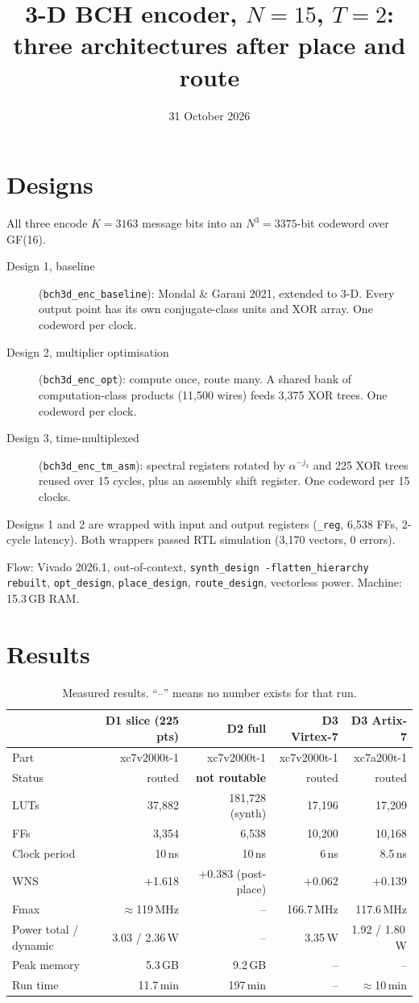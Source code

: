 \documentclass[10pt]{article}
\title{3-D BCH encoder, $N=15$, $T=2$: three architectures after place and route}
\author{}
\date{31 October 2026}
\begin{document}
\maketitle

\section{Designs}
All three encode $K=3163$ message bits into an $N^3=3375$-bit codeword over GF(16).
\begin{description}
\item[Design 1, baseline] (\texttt{bch3d\_enc\_baseline}): Mondal \& Garani 2021, extended to 3-D. Every output point has its own conjugate-class units and XOR array. One codeword per clock.
\item[Design 2, multiplier optimisation] (\texttt{bch3d\_enc\_opt}): compute once, route many. A shared bank of computation-class products (11,500 wires) feeds 3,375 XOR trees. One codeword per clock.
\item[Design 3, time-multiplexed] (\texttt{bch3d\_enc\_tm\_asm}): spectral registers rotated by $\alpha^{-j_3}$ and 225 XOR trees reused over 15 cycles, plus an assembly shift register. One codeword per 15 clocks.
\end{description}
Designs 1 and 2 are wrapped with input and output registers (\texttt{\_reg}, 6,538 FFs, 2-cycle latency). Both wrappers passed RTL simulation (3,170 vectors, 0 errors).

Flow: Vivado 2026.1, out-of-context, \texttt{synth\_design -flatten\_hierarchy rebuilt}, \texttt{opt\_design}, \texttt{place\_design}, \texttt{route\_design}, vectorless power. Machine: 15.3\,GB RAM.

\section{Results}
\begin{table}[h]\centering\small
\begin{tabular}{lrrrr}
\toprule
 & D1 slice (225 pts) & D2 full & D3 Virtex-7 & D3 Artix-7 \\
\midrule
Part & xc7v2000t-1 & xc7v2000t-1 & xc7v2000t-1 & xc7a200t-1 \\
Status & routed & \textbf{not routable} & routed & routed \\
LUTs & 37,882 & 181,728 (synth) & 17,196 & 17,209 \\
FFs & 3,354 & 6,538 & 10,200 & 10,168 \\
Clock period & 10\,ns & 10\,ns & 6\,ns & 8.5\,ns \\
WNS & +1.618 & +0.383 (post-place) & +0.062 & +0.139 \\
Fmax & $\approx$119\,MHz & -- & 166.7\,MHz & 117.6\,MHz \\
Power total / dynamic & 3.03 / 2.36\,W & -- & 3.35\,W & 1.92 / 1.80\,W \\
Peak memory & 5.3\,GB & 9.2\,GB & -- & -- \\
Run time & 11.7\,min & 197\,min & -- & $\approx$10\,min \\
\bottomrule
\end{tabular}
\caption{Measured results. ``--'' means no number exists for that run.}
\end{table}
\end{document}
